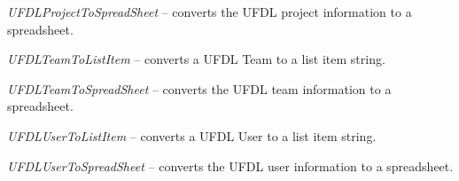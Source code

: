 \documentclass[a4paper]{book}
\begin{document}
\begin{tight_itemize}
  \item \textit{UFDLProjectToSpreadSheet} -- converts the UFDL project information to a spreadsheet.
  \item \textit{UFDLTeamToListItem} -- converts a UFDL Team to a list item string.
  \item \textit{UFDLTeamToSpreadSheet} -- converts the UFDL team information to a spreadsheet.
  \item \textit{UFDLUserToListItem} -- converts a UFDL User to a list item string.
  \item \textit{UFDLUserToSpreadSheet} -- converts the UFDL user information to a spreadsheet.
\end{tight_itemize}



\end{document}
